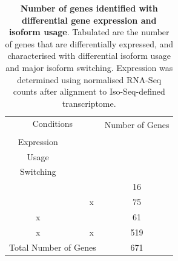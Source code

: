 \vspace{0.5cm}
\begin{table}[!htp]
	\centering
	\caption[Number of genes identified with differential gene expression and isoform usage]%
	{\textbf{Number of genes identified with differential gene expression and isoform usage}. Tabulated are the number of genes that are differentially expressed, and characterised with differential isoform usage and major isoform switching. Expression was determined using normalised RNA-Seq counts after alignment to Iso-Seq-defined transcriptome.}
	\begin{tabularx}{0.85\textwidth}{cccc}
		\toprule
		\multicolumn{3}{c}{Conditions}                                                                                                                                                                                       & \multirow{2}{*}{Number of Genes} \\ \cmidrule(r){1-3}
		\begin{tabular}[c]{@{}c@{}}Differential Gene\\  Expression\end{tabular} & \begin{tabular}[c]{@{}c@{}}Differential Isoform \\ Usage\end{tabular} & \begin{tabular}[c]{@{}c@{}}Major Isoform\\  Switching\end{tabular} &                                  \\ \midrule
		\checkmark  & \checkmark          & \checkmark                                                                & 16                               \\
		\checkmark                                                                      & \checkmark                                                                    & x                                                                  & 75                               \\
		x                                                                       & \checkmark                                                                    & \checkmark                                                                 & 61                               \\
		x                                                                       & \checkmark                                                                    & x                                                                  & 519                              \\ \midrule
		\multicolumn{3}{c}{Total Number of Genes}                                                                                                                                                                            & 671                              \\ \bottomrule
	\end{tabularx}
	\label{tab:DIU_DEA_nums}
\end{table}

